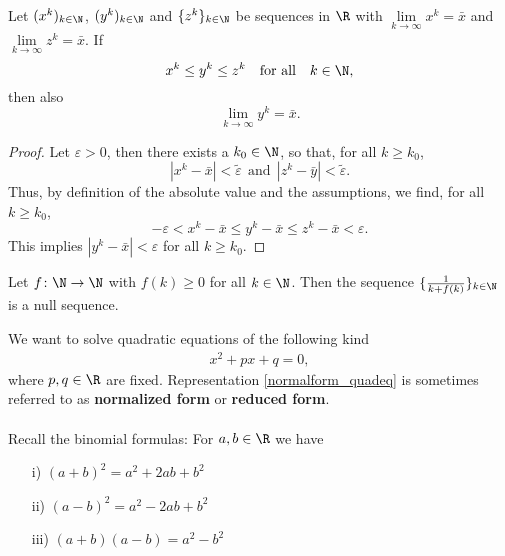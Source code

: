  
\begin{frame} 
~\\[-15pt]
\begin{theo}
	Let $(x^k)_{k\in \N}$, $(y^k)_{k\in \N}$ and $\{z^k\}_{k\in \N}$ be sequences in $\R$ with $\lim\limits_{k\to\infty}x^k= \bar{x}$ and $\lim\limits_{k\to\infty}z^k= \bar{x}$. If 
	$$x^k \leq y^k \leq z^k~~~\text{for all}~~~k\in\N,$$
	then also
	$$\lim\limits_{k\to\infty}y^k= \bar{x}.$$
\end{theo}
\begin{proof}\blank
	Let $\varepsilon> 0$, then there exists a $k_0 \in \N$, so that, for all $k \geq k_0$,
	$$|x^k-\bar{x}| <  \tilde{\varepsilon} ~~\text{and}~~|z^k-\bar{y}| <  \tilde{\varepsilon}.$$
	Thus, by definition of the absolute value and the assumptions, we find, for all $k \geq k_0$,
	$$-\varepsilon< x^k-\bar{x} \leq y^k-\bar{x} \leq z^k- \bar{x} < \varepsilon.$$
	This implies $|y^k - \bar{x}|< \varepsilon$ for all $k \geq k_0$.
\end{proof}
 \end{frame}
\begin{frame} 
\begin{ex}
	Let $f\colon \N \to \N$ with $f(k) \geq 0$ for all $k \in \N$. Then the sequence $\{\frac{1}{k + f(k)}\}_{k\in \N}$ is a null sequence.
\end{ex}
 \end{frame}




\begin{frame} 
We want to solve quadratic equations of the following kind
\begin{align} \label{normalform_quadeq}
x^2 + px +q = 0, 
\end{align}
where $p,q\in \R$ are fixed. Representation \eqref{normalform_quadeq} is sometimes referred to as {\color{defgruen} \textbf{normalized form}} or {\color{defgruen} \textbf{reduced form}}.\\
~\\
Recall the binomial formulas: For $a,b \in \R$ we have
\begin{itemize}
	\item[i)] $(a+b)^2 = a^2 + 2ab + b^2$ 
	\item[ii)] $(a-b)^2 = a^2 - 2ab + b^2$ 
	\item[iii)] $(a+b)(a-b) = a^2 - b^2$ 
\end{itemize}
\vspace{0.3cm}
\end{frame}


